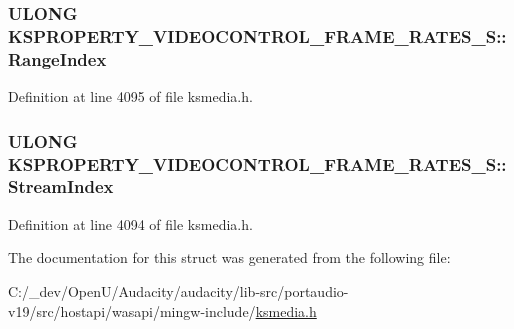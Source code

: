 \subsubsection[{\texorpdfstring{Range\+Index}{RangeIndex}}]{\setlength{\rightskip}{0pt plus 5cm}U\+L\+O\+NG K\+S\+P\+R\+O\+P\+E\+R\+T\+Y\+\_\+\+V\+I\+D\+E\+O\+C\+O\+N\+T\+R\+O\+L\+\_\+\+F\+R\+A\+M\+E\+\_\+\+R\+A\+T\+E\+S\+\_\+\+S\+::\+Range\+Index}\hypertarget{struct_k_s_p_r_o_p_e_r_t_y___v_i_d_e_o_c_o_n_t_r_o_l___f_r_a_m_e___r_a_t_e_s___s_a7d336e87441be1a6859bdf1197487118}{}\label{struct_k_s_p_r_o_p_e_r_t_y___v_i_d_e_o_c_o_n_t_r_o_l___f_r_a_m_e___r_a_t_e_s___s_a7d336e87441be1a6859bdf1197487118}


Definition at line 4095 of file ksmedia.\+h.

\subsubsection[{\texorpdfstring{Stream\+Index}{StreamIndex}}]{\setlength{\rightskip}{0pt plus 5cm}U\+L\+O\+NG K\+S\+P\+R\+O\+P\+E\+R\+T\+Y\+\_\+\+V\+I\+D\+E\+O\+C\+O\+N\+T\+R\+O\+L\+\_\+\+F\+R\+A\+M\+E\+\_\+\+R\+A\+T\+E\+S\+\_\+\+S\+::\+Stream\+Index}\hypertarget{struct_k_s_p_r_o_p_e_r_t_y___v_i_d_e_o_c_o_n_t_r_o_l___f_r_a_m_e___r_a_t_e_s___s_ac32ada6fed52efad67eabecab3a903ed}{}\label{struct_k_s_p_r_o_p_e_r_t_y___v_i_d_e_o_c_o_n_t_r_o_l___f_r_a_m_e___r_a_t_e_s___s_ac32ada6fed52efad67eabecab3a903ed}


Definition at line 4094 of file ksmedia.\+h.



The documentation for this struct was generated from the following file\+:\begin{DoxyCompactItemize}
\item 
C\+:/\+\_\+dev/\+Open\+U/\+Audacity/audacity/lib-\/src/portaudio-\/v19/src/hostapi/wasapi/mingw-\/include/\hyperlink{ksmedia_8h}{ksmedia.\+h}\end{DoxyCompactItemize}
